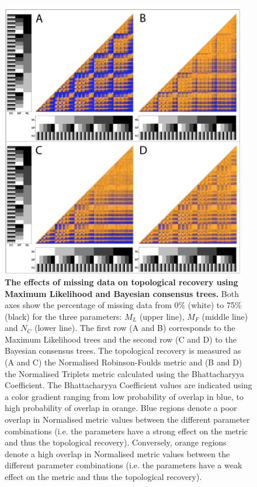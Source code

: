 \begin{figure}[!]
\centering
    \includegraphics[width=0.95\textwidth]{TEM/Figures/Fig6_double.pdf}
\caption[Effects of missing data on topological recovery using Maximum Likelihood and Bayesian consensus trees]{\textbf{The effects of missing data on topological recovery using Maximum Likelihood and Bayesian consensus trees.} Both axes show the percentage of missing data from 0\% (white) to 75\% (black) for the three parameters: $M_{L}$ (upper line), $M_{F}$ (middle line) and $N_{C}$ (lower line). The first row (A and B) corresponds to the Maximum Likelihood trees and the second row (C and D) to the Bayesian consensus trees. The topological recovery is measured as (A and C) the Normalised Robinson-Foulds metric and (B and D) the Normalised Triplets metric calculated using the Bhattacharyya Coefficient. The Bhattacharyya Coefficient values are indicated using a color gradient ranging from low probability of overlap in blue, to high probability of overlap in orange. Blue regions denote a poor overlap in Normalised metric values between the different parameter combinations (i.e. the parameters have a strong effect on the metric and thus the topological recovery). Conversely, orange regions denote a high overlap in Normalised metric values between the different parameter combinations (i.e. the parameters have a weak effect on the metric and thus the topological recovery).}
\label{Fig_Results-paircomp_within1}
\end{figure}

